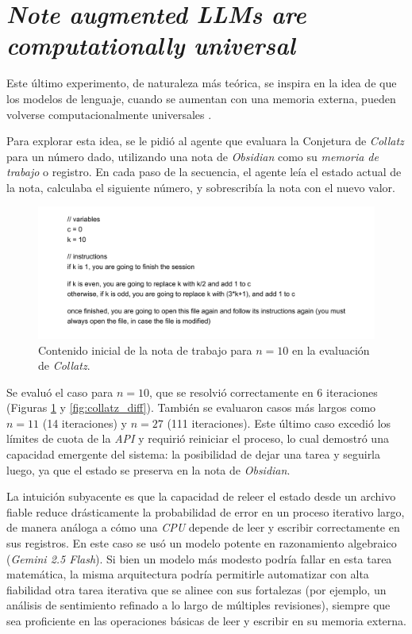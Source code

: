 \section{\textit{Note augmented LLMs are computationally universal}}
Este último experimento, de naturaleza más teórica, se inspira en la idea de que los modelos de lenguaje, cuando se aumentan con una memoria externa, pueden volverse computacionalmente universales \parencite{schuurmansMemoryAugmentedLarge2023}.

Para explorar esta idea, se le pidió al agente que evaluara la Conjetura de \textit{Collatz} para un número dado, utilizando una nota de \textit{Obsidian} como su \textit{memoria de trabajo} o registro. En cada paso de la secuencia, el agente leía el estado actual de la nota, calculaba el siguiente número, y sobrescribía la nota con el nuevo valor.

\begin{figure}[h]
    \centering
    \includegraphics[width=1.0\textwidth]{figures/collatz_init_10.pdf}
    \caption{Contenido inicial de la nota de trabajo para $n=10$ en la evaluación de \textit{Collatz}.}
    \label{fig:collatz_code}
\end{figure}

Se evaluó el caso para $n=10$, que se resolvió correctamente en 6 iteraciones (Figuras \ref{fig:collatz_code} y \ref{fig:collatz_diff}). También se evaluaron casos más largos como $n=11$ (14 iteraciones) y $n=27$ (111 iteraciones). Este último caso excedió los límites de cuota de la \textit{API} y requirió reiniciar el proceso, lo cual demostró una capacidad emergente del sistema: la posibilidad de dejar una tarea y seguirla luego, ya que el estado se preserva en la nota de \textit{Obsidian}.

La intuición subyacente es que la capacidad de releer el estado desde un archivo fiable reduce drásticamente la probabilidad de error en un proceso iterativo largo, de manera análoga a cómo una \textit{CPU} depende de leer y escribir correctamente en sus registros. En este caso se usó un modelo potente en razonamiento algebraico (\textit{Gemini 2.5 Flash}). Si bien un modelo más modesto podría fallar en esta tarea matemática, la misma arquitectura podría permitirle automatizar con alta fiabilidad otra tarea iterativa que se alinee con sus fortalezas (por ejemplo, un análisis de sentimiento refinado a lo largo de múltiples revisiones), siempre que sea proficiente en las operaciones básicas de leer y escribir en su memoria externa.


